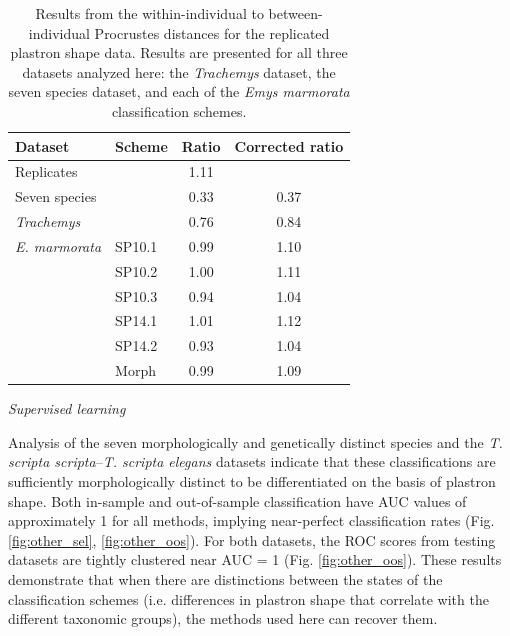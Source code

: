 \documentclass[12pt,letterpaper]{article}
\renewcommand{\subsection}[1]{%
\bigskip
\begin{center}
\begin{large}
\normalfont\itshape #1
\end{large}
\end{center}}
\begin{document}
\begin{table}
  \centering
  \caption{Results from the within-individual to between-individual Procrustes distances for the replicated plastron shape data. Results are presented for all three datasets analyzed here: the \textit{Trachemys} dataset, the seven species dataset, and each of the \textit{Emys marmorata} classification schemes.}
  \begin{tabular}{l l c c}
    \textbf{Dataset} & \textbf{Scheme} & \textbf{Ratio} & \textbf{Corrected ratio} \\
    \hline
    Replicates & & 1.11 & \\
    \hline
    Seven species & & 0.33 & 0.37 \\
    \textit{Trachemys} & & 0.76 & 0.84 \\
    \hline
    \textit{E. marmorata} & SP10.1 & 0.99 & 1.10 \\
     & SP10.2 & 1.00 & 1.11 \\
     & SP10.3 & 0.94 & 1.04 \\
     & SP14.1 & 1.01 & 1.12 \\
     & SP14.2 & 0.93 & 1.04 \\
     & Morph & 0.99 & 1.09 \\
    \hline
  \end{tabular}
  \label{tab:rep_res}
\end{table}


\subsection{Supervised learning}

Analysis of the seven morphologically and genetically distinct species and the \textit{T. scripta scripta}--\textit{T. scripta elegans} datasets indicate that these classifications are sufficiently morphologically distinct to be differentiated on the basis of plastron shape. Both in-sample and out-of-sample classification have AUC values of approximately 1 for all methods, implying near-perfect classification rates (Fig. \ref{fig:other_sel}, \ref{fig:other_oos}). For both datasets, the ROC scores from testing datasets are tightly clustered near AUC = 1 (Fig. \ref{fig:other_oos}). These results demonstrate that when there are distinctions between the states of the classification schemes (i.e. differences in plastron shape that correlate with the different taxonomic groups), the methods used here can recover them.
\end{document}
